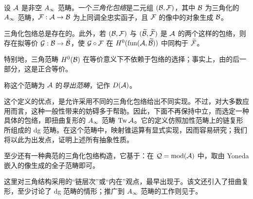 \begin{definition*}
设 $\mathcal A$ 是非空 $A_\infty$ 范畴。一个\emph{三角化包络}是二元组 $(\mathcal B,\mathcal F)$，其中 $\mathcal B$ 为三角化的 $A_\infty$ 范畴，$\mathcal F:\mathcal A\to\mathcal B$ 为上同调全忠实函子，且 $\mathcal F$ 的像中的对象生成 $\mathcal B$。
\end{definition*}
\begin{lemma}\label{st:3.20}
三角化包络总是存在的。此外，若 $(\mathcal B,\mathcal F)$ 与 $(\widetilde{\mathcal B},\widetilde{\mathcal F})$ 是 $\mathcal A$ 的两个这样的包络，则存在拟等价 $\mathcal G:\mathcal B\to\widetilde{\mathcal B}$，使 $\mathcal G\circ\mathcal F$ 在 $H^0(\operatorname{fun}(\mathcal A,\widetilde{\mathcal B}))$ 中同构于 $\widetilde{\mathcal F}$。
\end{lemma}
特别地，三角范畴 $H^0(\mathcal B)$ 在等价意义下不依赖于包络的选择；事实上，由的后一部分，这是正合等价。
\begin{definition*}
称这个范畴为 $\mathcal A$ 的\emph{导出范畴}，记作 $D(\mathcal A)$。
\end{definition*}
这个定义的优点，是允许采用不同的三角化包络给出不同实现。不过，对大多数应用而言，这种一般性带来的妨碍多于帮助。因此，下面不再保持中立，而选定一种具体的包络，即扭曲复形的 $A_\infty$ 范畴 $\operatorname{Tw}\mathcal A$。它的定义仿照加性范畴上的链复形所组成的 dg 范畴。在这个范畴中，映射锥运算有显式实现，因而容易研究；我们将以此为出发点，证明上述所有抽象性质。
\begin{note}\label{st:3.21}
至少还有一种典范的三角化包络构造，它基于：在 $\mathcal Q=\operatorname{mod}(\mathcal A)$ 中，取由 Yoneda 嵌入的像生成的全子范畴即可。
\end{note}
\begin{note}\label{st:3.22}
这里对三角结构采用的“链层次”或“内在”观点，最早出现于。该文还引入了扭曲复形，至少讨论了 dg 范畴的情形；推广到 $A_\infty$ 范畴的工作则见于。
\end{note}


